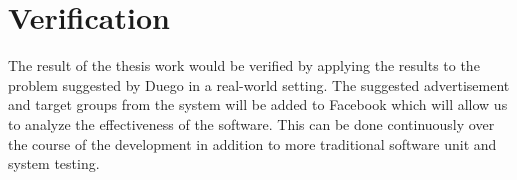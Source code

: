 \documentclass{article}
\begin{document}
\section{Verification}
The result of the thesis work would be verified by applying the results to the problem suggested by Duego in a real-world setting. The suggested advertisement and target groups from the system will be added to Facebook which will allow us to analyze the effectiveness of the software. This can be done continuously over the course of the development in addition to more traditional software unit and system testing.
\end{document}
